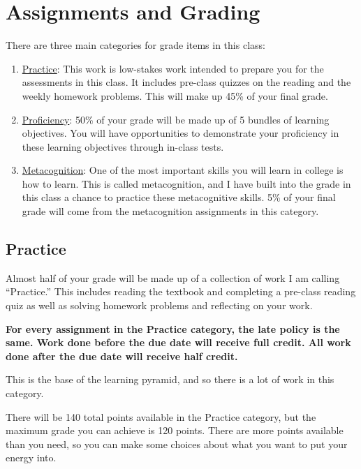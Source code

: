 \documentclass[
  letterpaper,
  DIV=11,
  numbers=noendperiod]{scrartcl}
\begin{document}
\section{Assignments and Grading}\label{assignments}

There are three main categories for grade items in this class:

\begin{enumerate}
\def\labelenumi{\arabic{enumi}.}
\item
  \hyperref[practicegrade]{Practice}: This work is low-stakes work
  intended to prepare you for the assessments in this class. It includes
  pre-class quizzes on the reading and the weekly homework problems.
  This will make up 45\% of your final grade.
\item
  \hyperref[LOgrade]{Proficiency}: 50\% of your grade will be made up of
  5 bundles of learning objectives. You will have opportunities to
  demonstrate your proficiency in these learning objectives through
  in-class tests.
\item
  \hyperref[metacognitiongrade]{Metacognition}: One of the most
  important skills you will learn in college is how to learn. This is
  called metacognition, and I have built into the grade in this class a
  chance to practice these metacognitive skills. 5\% of your final grade
  will come from the metacognition assignments in this category.
\end{enumerate}

\subsection{Practice}\label{practicegrade}

Almost half of your grade will be made up of a collection of work I am
calling ``Practice.'' This includes reading the textbook and completing
a pre-class reading quiz as well as solving homework problems and
reflecting on your work.

\textbf{For every assignment in the Practice category, the late policy
is the same. Work done before the due date will receive full credit. All
work done after the due date will receive half credit.}

This is the base of the learning pyramid, and so there is a lot of work
in this category.

There will be 140 total points available in the Practice category, but
the maximum grade you can achieve is 120 points. There are more points
available than you need, so you can make some choices about what you
want to put your energy into.
\end{document}
